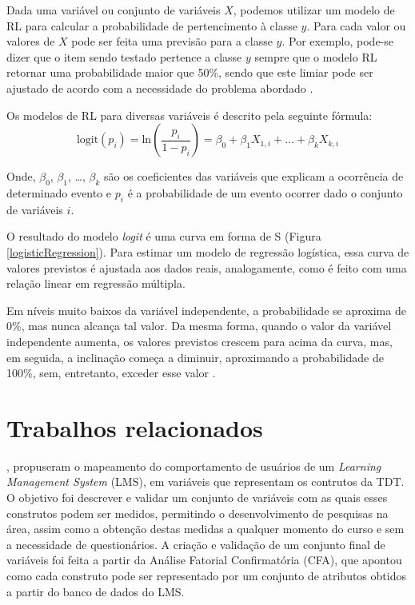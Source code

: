 Dada uma variável ou conjunto de variáveis \(X\), podemos utilizar um modelo de
RL para calcular a probabilidade de pertencimento à classe \(y\). Para cada
valor ou valores de \(X\) pode ser feita uma previsão para a classe \(y\). Por
exemplo, pode-se dizer que o item sendo testado pertence a classe \(y\) sempre
que o modelo RL retornar uma probabilidade maior que 50\%, sendo que este limiar
pode ser ajustado de acordo com a necessidade do problema abordado
\cite{james2013introduction}.

Os modelos de RL para diversas variáveis é descrito pela seguinte fórmula:
\[\text{logit}(p_i)
= \text{ln}\left(\frac{p_i}{1 - p_i}\right)
= \beta_0 + \beta_1 X_{1,i} + \ldots + \beta_k X_{k,i}\]

Onde, \(\beta_0\), \(\beta_1\), \ldots, \(\beta_k\) são os coeficientes das
variáveis que explicam a ocorrência de determinado evento e \(p_i\) é a
probabilidade de um evento ocorrer dado o conjunto de variáveis \(i\).

O resultado do modelo \textit{logit} é uma curva em forma de S (Figura
\ref{logisticRegression}).  Para estimar um modelo de regressão logística, essa
curva de valores previstos é ajustada aos dados reais, analogamente, como é
feito com uma relação linear em regressão múltipla.


Em níveis muito baixos da variável independente, a probabilidade se aproxima de
0\%, mas nunca alcança tal valor. Da mesma forma, quando o valor da variável
independente aumenta, os valores previstos crescem para acima da curva, mas, em
seguida, a inclinação começa a diminuir, aproximando a probabilidade de 100\%,
sem, entretanto, exceder esse valor \cite{hair2009analise}.

\section{Trabalhos relacionados}

, propuseram o mapeamento do comportamento de
usuários de um \textit{Learning Management System} (LMS), em variáveis que
representam os contrutos da TDT. O objetivo foi descrever e validar um conjunto
de variáveis com as quais esses construtos podem ser medidos, permitindo o
desenvolvimento de pesquisas na área, assim como a obtenção destas medidas a
qualquer momento do curso e sem a necessidade de questionários. A criação e
validação de um conjunto final de variáveis foi feita a partir da Análise
Fatorial Confirmatória (CFA), que apontou como cada construto pode ser
representado por um conjunto de atributos obtidos a partir do banco de dados do
LMS.

